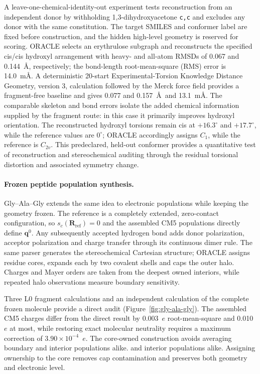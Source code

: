 \documentclass[journal=jctcce,manuscript=article]{achemso}
\begin{document}
A leave-one-chemical-identity-out experiment tests reconstruction from an
independent donor by withholding
1,3-dihydroxyacetone \texttt{c,c} and excludes any donor with the same
constitution.  The target SMILES and conformer label are fixed before
construction, and the hidden high-level geometry is reserved for scoring.  ORACLE
selects an erythrulose subgraph and reconstructs the specified cis/cis
hydroxyl arrangement with heavy- and all-atom RMSDs of 0.067 and
0.144~\AA, respectively; the bond-length root-mean-square (RMS) error is
14.0~m\AA.  A deterministic 20-start Experimental-Torsion Knowledge Distance
Geometry, version 3, calculation followed by the Merck force field provides a
fragment-free baseline and
gives 0.077 and 0.157~\AA\ and 13.1~m\AA.  The comparable skeleton and bond
errors isolate the added chemical information supplied by the fragment
route: in this case it primarily improves hydroxyl orientation.  The
reconstructed hydroxyl torsions remain cis at $+16.3^\circ$ and
$+17.7^\circ$, while the reference values are $0^\circ$; ORACLE accordingly
assigns $C_1$, while the reference is $C_{2v}$.  This predeclared, held-out
conformer provides a quantitative test of reconstruction and stereochemical
auditing through the residual torsional distortion and associated symmetry
change.

\paragraph{Frozen peptide population synthesis.}
Gly--Ala--Gly extends the same idea to electronic populations while keeping
the geometry frozen.  The reference is a completely extended, zero-contact
configuration, so $s_c(\mathbf R_{\mathrm{ref}})=0$ and the assembled CM5
populations directly define $\mathbf q^0$.  Any subsequently accepted
hydrogen bond adds donor polarization, acceptor polarization and charge
transfer through its continuous dimer rule.  The same parser generates the
stereochemical Cartesian structure; ORACLE assigns residue cores, expands
each by two covalent shells and caps the outer halo.  Charges and Mayer orders
are taken from the deepest owned interiors, while repeated halo observations
measure boundary sensitivity.

Three L0 fragment calculations and an independent calculation of the complete
frozen molecule provide a direct audit (Figure~\ref{fig:gly-ala-gly}).  The
assembled CM5 charges differ from the direct result by 0.003~$e$
root-mean-square and 0.010~$e$ at most, while restoring exact molecular
neutrality requires a maximum correction of
$3.90\times10^{-4}$~$e$.  The core-owned construction avoids averaging boundary
and interior populations alike.
and interior populations alike.  Assigning ownership to the core removes cap
contamination and preserves both geometry and electronic level.
\end{document}
